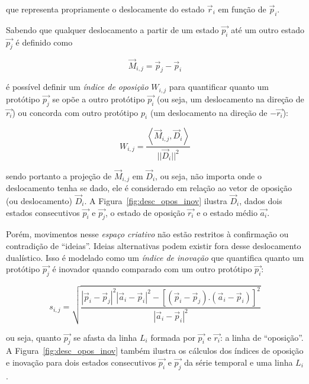 \noindent que representa propriamente o deslocamente do estado $\vec{r}_i$ em
função de $\vec{p}_i$.

Sabendo que qualquer deslocamento a partir de um estado $\vec{p_i}$ até um outro
estado $\vec{p_j}$ é definido como

\begin{equation}
\vec{M}_{i,j} = \vec{p}_j - \vec{p}_i
\end{equation}

\noindent é possível definir um \emph{índice de oposição} $W_{i,j}$ para
quantificar quanto um protótipo $\vec{p_j}$ se opõe a outro protótipo $\vec{p_i}$ (ou seja,
um deslocamento na direção de $\vec{r_i}$) ou concorda com outro protótipo $p_i$
(um deslocamento na direção de $-\vec{r_i}$):

\begin{equation}
W_{i,j} = \frac{\left< \vec{M}_{i,j}, \vec{D}_i\right>}{||\vec{D}_i||^2}
\end{equation}

\noindent sendo portanto a projeção de $\vec{M}_{i,j}$ em $\vec{D}_i$, ou seja,
não importa onde o deslocamento tenha se dado, ele é considerado em relação ao
vetor de oposição (ou deslocamento) $\vec{D}_i$. A
Figura~\ref{fig:desc_opos_inov} ilustra $\vec{D}_i$, dados dois estados
consecutivos $\vec{p_i}$ e $\vec{p_j}$, o estado de oposição $\vec{r_i}$ e o
estado médio $\vec{a_i}$.

Porém, movimentos nesse \textit{espaço criativo} não estão restritos à
confirmação ou contradição de ``ideias''. Ideias alternativas podem existir fora
desse deslocamento dualístico. Isso é modelado como um \emph{índice de inovação}
que quantifica quanto um protótipo $\vec{p_j}$ é inovador quando comparado com um
outro protótipo $\vec{p_i}$:


\begin{equation}
s_{i,j} = \sqrt{\frac{|\vec{p}_i-\vec{p}_j|^2
          |\vec{a}_i-\vec{p}_i|^2 - 
          [(\vec{p}_i-\vec{p}_j) . 
            (\vec{a}_i-\vec{p}_i)]^2}
        {|\vec{a}_i-\vec{p}_i|^2}}
\end{equation}

\noindent ou seja, quanto $\vec{p_j}$ se afasta da linha $L_i$ formada por $\vec{p_i}$ e
$\vec{r_i}$: a linha de ``oposição''.  A Figura~\ref{fig:desc_opos_inov} também
ilustra os cálculos dos índices de oposição e inovação para dois estados
consecutivos $\vec{p_i}$ e $\vec{p_j}$ da série temporal e uma linha $L_i$.

